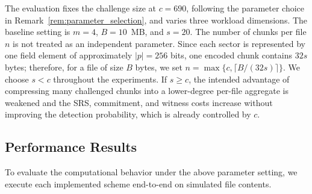 \documentclass[lettersize,journal]{IEEEtran}
\newcommand{\CompExp}{\mathcal{E}}
\begin{document}
The evaluation fixes the challenge size at $c=690$, following the parameter choice in Remark~\ref{rem:parameter_selection}, and varies three workload dimensions.
The baseline setting is $m=4$, $B=10$~MB, and $s=20$. 
The number of chunks per file $n$ is not treated as an independent parameter. Since each sector is represented by one field element of approximately $|p|=256$ bits, one encoded chunk contains $32s$ bytes; therefore, for a file of size $B$ bytes, we set \(n=\max\{c,\lceil B/(32s)\rceil\}\). 
We choose $s<c$ throughout the experiments. 
If $s\geq c$, the intended advantage of compressing many challenged chunks into a lower-degree per-file aggregate is weakened and the SRS, commitment, and witness costs increase without improving the detection probability, which is already controlled by $c$.


\subsection{Performance Results}

To evaluate the computational behavior under the above parameter setting, we execute each implemented scheme end-to-end on simulated file contents. 
\end{document}
